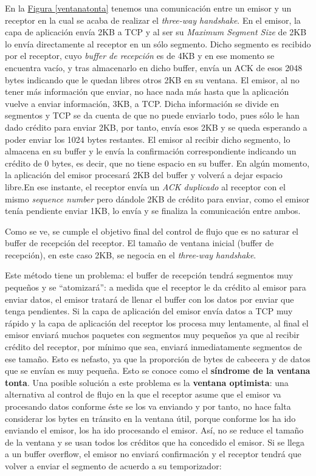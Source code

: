 \documentclass[10pt,a4paper,spanish]{report}
\begin{document}
En la \hyperref[ventanatonta]{Figura \ref*{ventanatonta}} tenemos una comunicación entre un emisor y un receptor en la cual se acaba de realizar el \textit{\textcolor{tema3}{three-way handshake}}. En el emisor, la capa de aplicación envía 2KB a TCP y al ser su \textit{\textcolor{tema3}{Maximum Segment Size}} de 2KB lo envía directamente al receptor en un sólo segmento. Dicho segmento es recibido por el receptor, cuyo \textit{\textcolor{tema3}{buffer de recepción}} es de 4KB y en ese momento se encuentra vacío, y tras almacenarlo en dicho buffer, envía un ACK de esos 2048 bytes indicando que le quedan libres otros 2KB en su ventana. El emisor, al no tener más información que enviar, no hace nada más hasta que la aplicación vuelve a enviar información, 3KB, a TCP. Dicha información se divide en segmentos y TCP se da cuenta de que no puede enviarlo todo, pues sólo le han dado crédito para enviar 2KB, por tanto, envía esos 2KB y se queda esperando a poder enviar los 1024 bytes restantes. El emisor al recibir dicho segmento, lo almacena en su buffer y le envía la confirmación correspondiente indicando un crédito de 0 bytes, es decir, que no tiene espacio en su buffer. En algún momento, la aplicación del emisor procesará 2KB del buffer y volverá a dejar espacio libre.En ese instante, el receptor envía un \textit{\textcolor{tema3}{ACK duplicado}} al receptor con el mismo \textit{\textcolor{tema3}{sequence number}} pero dándole 2KB de crédito para enviar, como el emisor tenía pendiente enviar 1KB, lo envía y se finaliza la comunicación entre ambos.

Como se ve, se cumple el objetivo final del control de flujo que es no saturar el buffer de recepción del receptor. El tamaño de ventana inicial (buffer de recepción), en este caso 2KB, se negocia en el \textit{\textcolor{tema3}{three-way handshake}}.

Este método tiene un problema: el buffer de recepción tendrá segmentos muy pequeños y se ``atomizará'': a medida que el receptor le da crédito al emisor para enviar datos, el emisor tratará de llenar el buffer con los datos por enviar que tenga pendientes. Si la capa de aplicación del emisor envía datos a TCP muy rápido y la capa de aplicación del receptor los procesa muy lentamente, al final el emisor enviará muchos paquetes con segmentos muy pequeños ya que al recibir crédito del receptor, por mínimo que sea, enviará inmediatamente segmentos de ese tamaño. Esto es nefasto, ya que la proporción de bytes de cabecera y de datos que se envían es muy pequeña. Esto se conoce como el \textbf{\textcolor{tema3}{síndrome de la ventana tonta}}. Una posible solución a este problema es la \textbf{\textcolor{tema3}{ventana optimista}}: una alternativa al control de flujo en la que el receptor asume que el emisor va procesando datos conforme éste se los va enviando y por tanto, no hace falta considerar los bytes en tránsito en la ventana útil, porque conforme los ha ido enviando el emisor, los ha ido procesando el emisor. Así, no se reduce el tamaño de la ventana y se usan todos los créditos que ha concedido el emisor. Si se llega a un buffer overflow, el emisor no enviará confirmación y el receptor tendrá que volver a enviar el segmento de acuerdo a su temporizador:
\end{document}
